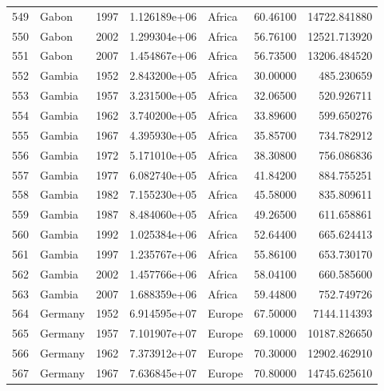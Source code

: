 \documentclass[
  letterpaper,
  DIV=11,
  numbers=noendperiod]{scrreprt}
\begin{document}
\begin{tabular}{llrrlrr}
549  &                     Gabon &  1997 &  1.126189e+06 &    Africa &  60.46100 &   14722.841880 \\
550  &                     Gabon &  2002 &  1.299304e+06 &    Africa &  56.76100 &   12521.713920 \\
551  &                     Gabon &  2007 &  1.454867e+06 &    Africa &  56.73500 &   13206.484520 \\
552  &                    Gambia &  1952 &  2.843200e+05 &    Africa &  30.00000 &     485.230659 \\
553  &                    Gambia &  1957 &  3.231500e+05 &    Africa &  32.06500 &     520.926711 \\
554  &                    Gambia &  1962 &  3.740200e+05 &    Africa &  33.89600 &     599.650276 \\
555  &                    Gambia &  1967 &  4.395930e+05 &    Africa &  35.85700 &     734.782912 \\
556  &                    Gambia &  1972 &  5.171010e+05 &    Africa &  38.30800 &     756.086836 \\
557  &                    Gambia &  1977 &  6.082740e+05 &    Africa &  41.84200 &     884.755251 \\
558  &                    Gambia &  1982 &  7.155230e+05 &    Africa &  45.58000 &     835.809611 \\
559  &                    Gambia &  1987 &  8.484060e+05 &    Africa &  49.26500 &     611.658861 \\
560  &                    Gambia &  1992 &  1.025384e+06 &    Africa &  52.64400 &     665.624413 \\
561  &                    Gambia &  1997 &  1.235767e+06 &    Africa &  55.86100 &     653.730170 \\
562  &                    Gambia &  2002 &  1.457766e+06 &    Africa &  58.04100 &     660.585600 \\
563  &                    Gambia &  2007 &  1.688359e+06 &    Africa &  59.44800 &     752.749726 \\
564  &                   Germany &  1952 &  6.914595e+07 &    Europe &  67.50000 &    7144.114393 \\
565  &                   Germany &  1957 &  7.101907e+07 &    Europe &  69.10000 &   10187.826650 \\
566  &                   Germany &  1962 &  7.373912e+07 &    Europe &  70.30000 &   12902.462910 \\
567  &                   Germany &  1967 &  7.636845e+07 &    Europe &  70.80000 &   14745.625610 \\

\end{tabular}
\end{document}
